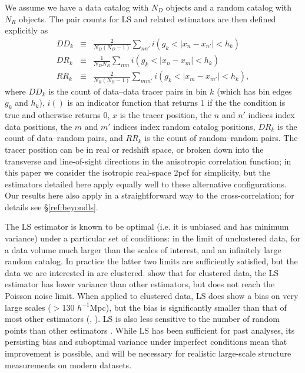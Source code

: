 \documentclass[modern]{aastex62}
\newcommand{\cf}{2pcf\xspace} %
\newcommand{\LS}{LS\xspace}
\newcommand{\hmpc}{$h^{-1}$Mpc}
\begin{document}
We assume we have a data catalog with $N_D$ objects and a random catalog with $N_R$ objects.
The pair counts for \LS and related estimators are then defined explicitly as
\begin{eqnarray}\displaystyle
\label{eq:ls1}
DD_k &\equiv& \frac{2}{N_D(N_D-1)} \sum_{n n'} i(g_k < |x_n - x_{n'}| < h_k) \\ 
DR_k &\equiv& \frac{1}{N_D N_R} \sum_{n m} i(g_k < |x_n - x_m| < h_k) \\
\label{eq:ls3}
RR_k &\equiv& \frac{2}{N_R(N_R-1)} \sum_{m m'} i(g_k < |x_m - x_{m'}| < h_k),
\end{eqnarray}
where $DD_k$ is the count of data--data tracer pairs in bin $k$ (which has bin edges $g_k$ and $h_k$), $i()$ is an indicator function that returns $1$ if the the condition is true and otherwise returns $0$, $x$ is the tracer position, the $n$ and $n'$ indices index data positions, the $m$ and $m'$ indices index random catalog positions, $DR_k$ is the count of data--random pairs, and $RR_k$ is the count of random--random pairs.
The tracer position can be in real or redshift space, or broken down into the transverse and line-of-sight directions in the anisotropic correlation function; in this paper we consider the isotropic real-space \cf for simplicity, but the estimators detailed here apply equally well to these alternative configurations.
Our results here also apply in a straightforward way to the cross-correlation; for details see \S\ref{ref:beyondls}. 

The \LS estimator is known to be optimal (i.e. it is unbiased and has minimum variance) under a particular set of conditions: in the limit of unclustered data, for a data volume much larger than the scales of interest, and an infinitely large random catalog. 
In practice the latter two limits are sufficiently satisfied, but the data we are interested in are clustered.
\cite{VargasMagana2013} show that for clustered data, the \LS estimator has lower variance than other estimators, but does not reach the Poisson noise limit.
When applied to clustered data, \LS does show a bias on very large scales ($>$130 \hmpc), but the bias is significantly smaller than that of most other estimators (\citealt{Kerscher1999}, \citealt{VargasMagana2013}).
\LS is also less sensitive to the number of random points than other estimators \citep{Kerscher2000}.
While \LS has been sufficient for past analyses, its persisting bias and suboptimal variance under imperfect conditions mean that improvement is possible, and will be necessary for realistic large-scale structure measurements on modern datasets.
\end{document}
